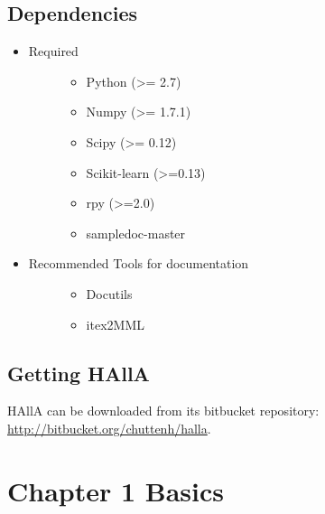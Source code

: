 \documentclass[letterpaper,10pt,english]{sphinxmanual}
\begin{document}
\subsection{Dependencies}
\label{index:dependencies}\begin{itemize}
\item {} \begin{description}
\item[{Required}] \leavevmode\begin{itemize}
\item {} 
Python (\textgreater{}= 2.7)

\item {} 
Numpy (\textgreater{}= 1.7.1)

\item {} 
Scipy (\textgreater{}= 0.12)

\item {} 
Scikit-learn (\textgreater{}=0.13)

\item {} 
rpy (\textgreater{}=2.0)

\item {} 
sampledoc-master

\end{itemize}

\end{description}

\item {} \begin{description}
\item[{Recommended Tools for documentation}] \leavevmode\begin{itemize}
\item {} 
Docutils

\item {} 
itex2MML

\end{itemize}

\end{description}

\end{itemize}


\subsection{Getting HAllA}
\label{index:getting-halla}
HAllA can be downloaded from its bitbucket repository: \href{http://bitbucket.org/chuttenh/halla}{http://bitbucket.org/chuttenh/halla}.


\section{Chapter 1 Basics}
\label{index:chapter-1-basics}
\end{document}
